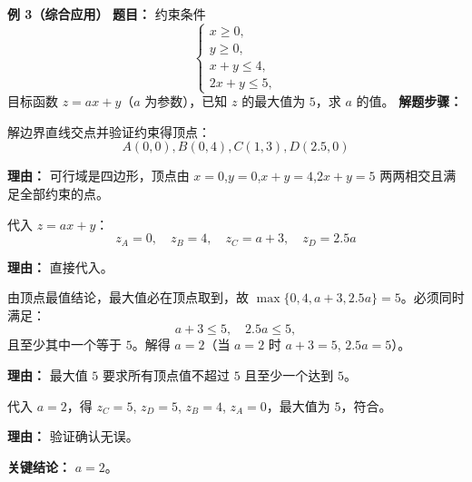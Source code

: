 \begin{examplebox}
	\medskip
	\textbf{\textcolor{CExample}{例 3（综合应用）}}
	\textbf{\textcolor{CExample}{题目：}}
	约束条件
	\[
		\begin{cases}
			x\geq 0,\\ y\geq 0,\\ x+y\leq 4,\\ 2x+y\leq 5,
		\end{cases}
	\]
	目标函数 $z=ax+y$（$a$ 为参数），已知 $z$ 的最大值为 $5$，求 $a$ 的值。
	\textbf{\textcolor{CExample}{解题步骤：}}
	\begin{description}[style=nextline, leftmargin=2.8em, labelsep=0.5em, itemsep=0.45em]
		\item[\textbf{第一步（求顶点）：}]
			解边界直线交点并验证约束得顶点：
			\[
				A(0,0), B(0,4), C(1,3), D(2.5,0)
			\]
			\par\textbf{理由：} 可行域是四边形，顶点由 $x=0$,$y=0$,$x+y=4$,$2x+y=5$ 两两相交且满足全部约束的点。
		\item[\textbf{第二步（顶点函数值）：}]
			代入 $z=ax+y$：
			\[
				z_A=0,\quad z_B=4,\quad z_C=a+3,\quad z_D=2.5a
			\]
			\par\textbf{理由：} 直接代入。
		\item[\textbf{第三步（利用最值条件）：}]
			由顶点最值结论，最大值必在顶点取到，故 $\max\{0,4,a+3,2.5a\}=5$。必须同时满足：
			\[
				a+3\leq 5,\quad 2.5a\leq 5,
			\]
			且至少其中一个等于 $5$。解得 $a=2$（当 $a=2$ 时 $a+3=5$, $2.5a=5$）。
			\par\textbf{理由：} 最大值 $5$ 要求所有顶点值不超过 $5$ 且至少一个达到 $5$。
		\item[\textbf{第四步（验证）：}]
			代入 $a=2$，得 $z_C=5$, $z_D=5$, $z_B=4$, $z_A=0$，最大值为 $5$，符合。
			\par\textbf{理由：} 验证确认无误。
	\end{description}
	\textbf{\textcolor{CExample}{关键结论：}}
	\textbf{$a=2$}。
\end{examplebox}
